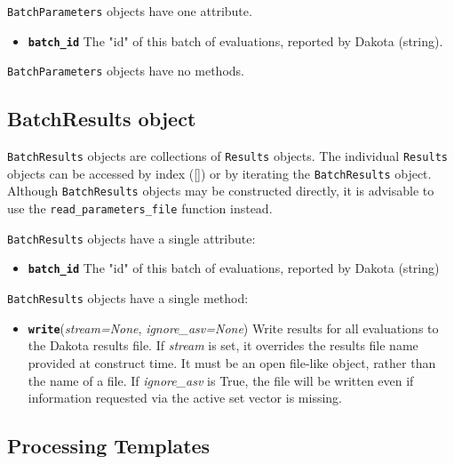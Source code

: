 {\tt BatchParameters} objects have one attribute.

\begin{itemize}
  \item{} \label{index:dakota.interfacing.BatchParameters.batch_id}\textbf{\texttt{batch\_id}} The "id" of this batch of evaluations, reported by Dakota (string).
\end{itemize}

{\tt BatchParameters} objects have no methods.

\subsection{BatchResults object}

{\tt BatchResults} objects are collections of {\tt Results} objects. The individual {\tt Results} objects can be
accessed by index ({[}{]}) or by iterating the {\tt BatchResults} object. Although {\tt BatchResults} objects may be 
constructed directly, it is advisable to use the {\tt read\_parameters\_file} function instead.

{\tt BatchResults} objects have a single attribute:

\begin{itemize}
  \item{} \label{index:dakota.interfacing.BatchResults.batch_id}\textbf{\texttt{batch\_id}} The "id" of this batch of evaluations, reported by Dakota (string)
\end{itemize}

{\tt BatchResults} objects have a single method:

\begin{itemize}
\item {}
	\label{index:dakota.interfacing.Results.write}\textbf{\texttt{write}}({\emph{stream=None}, \emph{ignore\_asv=None}}){}
	Write results for all evaluations to the Dakota results file. If \emph{stream} is set, it overrides the results file name provided at construct time. It must be an open file-like object, rather than the name of a file. If \emph{ignore\_asv} is True, the file will be written even if information requested via the active set vector is missing.
\end{itemize}
\subsection{Processing Templates}

